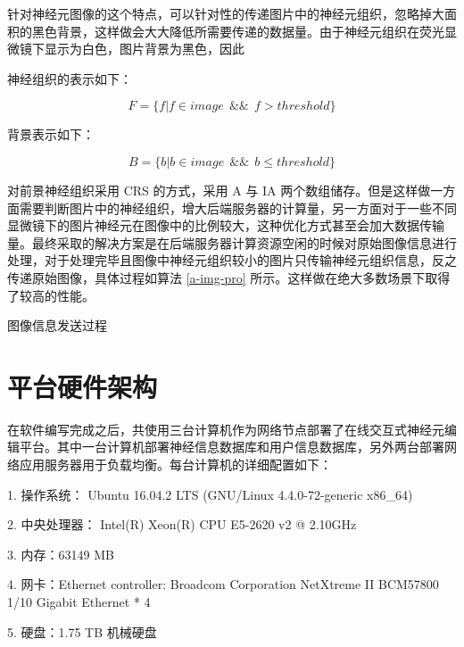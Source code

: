 针对神经元图像的这个特点，可以针对性的传递图片中的神经元组织，忽略掉大面积的黑色背景，这样做会大大降低所需要传递的数据量。由于神经元组织在荧光显微镜下显示为白色，图片背景为黑色，因此

神经组织的表示如下：

$$F = \{f | f \in image ~~ \&\& ~~ f > threshold\} $$

背景表示如下：

$$B = \{b | b \in image ~~ \&\& ~~ b \leq threshold\} $$

对前景神经组织采用 CRS 的方式，采用 A 与 IA 两个数组储存。但是这样做一方面需要判断图片中的神经组织，增大后端服务器的计算量，另一方面对于一些不同显微镜下的图片神经元在图像中的比例较大，这种优化方式甚至会加大数据传输量。最终采取的解决方案是在后端服务器计算资源空闲的时候对原始图像信息进行处理，对于处理完毕且图像中神经元组织较小的图片只传输神经元组织信息，反之传递原始图像，具体过程如算法 \ref{a-img-pro} 所示。这样做在绝大多数场景下取得了较高的性能。

\begin{algorithm}
  \caption{图像信息发送过程}
  \begin{algorithmic}[1] %
    \ELSE
      \ENDIF
    \ENDIF
  \end{algorithmic}
  \label{a-img-pro}
\end{algorithm}

\section{平台硬件架构}
在软件编写完成之后，共使用三台计算机作为网络节点部署了在线交互式神经元编辑平台。其中一台计算机部署神经信息数据库和用户信息数据库，另外两台部署网络应用服务器用于负载均衡。每台计算机的详细配置如下：

1. 操作系统： Ubuntu 16.04.2 LTS (GNU/Linux 4.4.0-72-generic x86\_64)

2. 中央处理器： Intel(R) Xeon(R) CPU E5-2620 v2 @ 2.10GHz

3. 内存：63149 MB

4. 网卡：Ethernet controller: Broadcom Corporation NetXtreme II BCM57800 1/10 Gigabit Ethernet * 4

5. 硬盘：1.75 TB 机械硬盘

